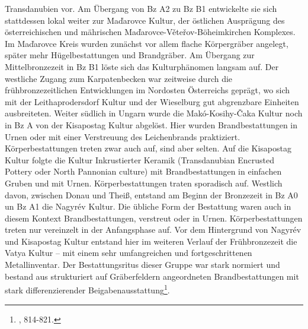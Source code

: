 \documentclass[openany,twoside,twocolumn]{book}
\let\rmarkdownfootnote\footnote%
\def\footnote{\protect\rmarkdownfootnote}
\begin{document}
Transdanubien vor. Am Übergang von Bz A2 zu Bz B1 entwickelte sie sich
stattdessen lokal weiter zur Maďarovce Kultur, der östlichen Ausprägung
des österreichischen und mährischen Maďarovce-Věteřov-Böheimkirchen
Komplexes. Im Maďarovce Kreis wurden zunächst vor allem flache
Körpergräber angelegt, später mehr Hügelbestattungen und Brandgräber. Am
Übergang zur Mittelbronzezeit in Bz B1 löste sich das Kulturphänomen
langsam auf. Der westliche Zugang zum Karpatenbecken war zeitweise durch
die frühbronzezeitlichen Entwicklungen im Nordosten Österreichs geprägt,
wo sich mit der Leithaprodersdorf Kultur und der Wieselburg gut
abgrenzbare Einheiten ausbreiteten. Weiter südlich in Ungarn wurde die
Makó-Kosihy-Čaka Kultur noch in Bz A von der Kisapostag Kultur abgelöst.
Hier wurden Brandbestattungen in Urnen oder mit einer Verstreuung des
Leichenbrands praktiziert. Körperbestattungen treten zwar auch auf, sind
aber selten. Auf die Kisapostag Kultur folgte die Kultur Inkrustierter
Keramik (Transdanubian Encrusted Pottery oder North Pannonian culture)
mit Brandbestattungen in einfachen Gruben und mit Urnen.
Körperbestattungen traten sporadisch auf. Westlich davon, zwischen Donau
und Theiß, entstand am Beginn der Bronzezeit in Bz A0 un Bz A1 die
Nagyrév Kultur. Die übliche Form der Bestattung waren auch in diesem
Kontext Brandbestattungen, verstreut oder in Urnen. Körperbestattungen
treten nur vereinzelt in der Anfangsphase auf. Vor dem Hintergrund von
Nagyrév und Kisapostag Kultur entstand hier im weiteren Verlauf der
Frühbronzezeit die Vatya Kultur -- mit einem sehr umfangreichen und
fortgeschrittenen Metallinventar. Der Bestattungsritus dieser Gruppe war
stark normiert und bestand aus strukturiert auf Gräberfeldern
angeordneten Brandbestattungen mit stark differenzierender
Beigabenausstattung\footnote{\textcite{markova_slovakia_2013}, 814-821.}.
\end{document}
